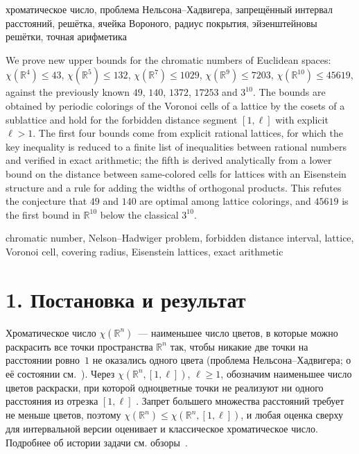 \documentclass{article}
\theoremstyle{plain}
\theoremstyle{remark}
\newcommand{\R}{\mathbb{R}}
\begin{document}
\begin{keywords}
хроматическое число, проблема Нельсона--Хадвигера, запрещённый интервал
расстояний, решётка, ячейка Вороного, радиус покрытия, эйзенштейновы
решётки, точная арифметика
\end{keywords}

\begin{altabstract}
We prove new upper bounds for the chromatic numbers of Euclidean spaces:
$\chi(\R^4)\le43$, $\chi(\R^5)\le132$, $\chi(\R^7)\le1029$,
$\chi(\R^9)\le7203$, $\chi(\R^{10})\le45619$, against the previously known
$49$, $140$, $1372$, $17253$ and $3^{10}$. The bounds are obtained by
periodic colorings of the Voronoi cells of a lattice by the cosets of a
sublattice and hold for the forbidden distance segment $[1,\ell]$ with
explicit $\ell>1$. The first four bounds come from explicit rational
lattices, for which the key inequality is reduced to a finite list of
inequalities between rational numbers and verified in exact arithmetic; the
fifth is derived analytically from a lower bound on the distance between
same-colored cells for lattices with an Eisenstein structure and a rule for adding the widths of orthogonal
products. This refutes the conjecture that $49$ and $140$ are optimal among
lattice colorings, and $45619$ is the first bound in $\R^{10}$ below the
classical $3^{10}$.
\end{altabstract}

\begin{altkeywords}
chromatic number, Nelson--Hadwiger problem, forbidden distance interval,
lattice, Voronoi cell, covering radius, Eisenstein lattices, exact
arithmetic
\end{altkeywords}

\section*{1. Постановка и результат}

Хроматическое число $\chi(\R^n)$~--- наименьшее число цветов, в которые
можно раскрасить все точки пространства $\R^n$ так, чтобы никакие две точки
на расстоянии ровно~$1$ не оказались одного цвета (проблема
Нельсона--Хадвигера; о её состоянии см.~\cite{Soifer,deGrey}). Через
$\chi(\R^n,[1,\ell])$, $\ell\ge1$, обозначим наименьшее число цветов
раскраски, при которой одноцветные точки не реализуют ни одного расстояния
из отрезка $[1,\ell]$ \cite{Ivanov2011}. Запрет большего множества
расстояний требует не меньше цветов, поэтому
$\chi(\R^n)\le\chi(\R^n,[1,\ell])$, и любая оценка сверху для интервальной
версии оценивает и классическое хроматическое число. Подробнее об истории
задачи см. обзоры~\cite{Raigorodskii2001,Raigorodskii2013,Raigorodskii2014,BogolubskyRaigorodskii}.
\end{document}
